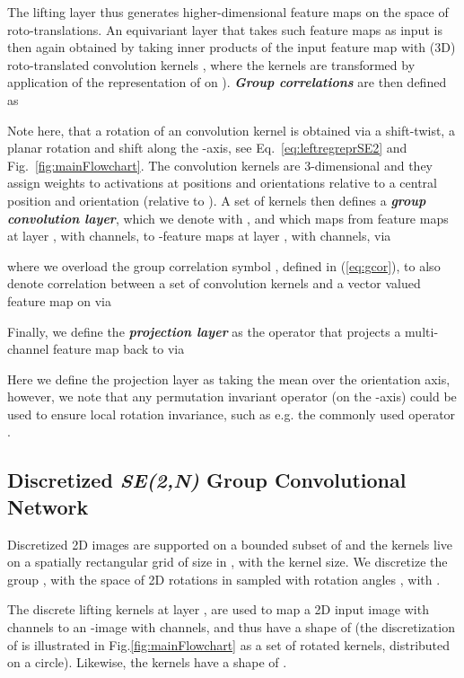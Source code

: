 \documentclass[twocolumn,final]{article}
\newcommand{\se}[1]{\textit{SE(#1)}}
\newcommand{\mset}[2]{}
\begin{document}
The lifting layer thus generates higher-dimensional feature maps on the space of roto-translations. An  equivariant layer that takes such feature maps as input is then again obtained by taking inner products of the input feature map  with (3D) roto-translated convolution kernels , where the kernels are transformed by application of the representation  of  on ).
\textbf{\emph{Group correlations}} are then defined as

Note here, that a rotation of an  convolution kernel is obtained via a shift-twist, a planar rotation and shift along the -axis, see Eq.~\eqref{eq:leftregreprSE2} and Fig.~\ref{fig:mainFlowchart}. The convolution kernels  are 3-dimensional and they assign weights to activations at positions and orientations relative to a central position and orientation (relative to ). A set of  kernels  then defines a \textbf{\emph{group convolution layer}}, which we denote with , and which maps from  feature maps  at layer , with  channels, to -feature maps  at layer , with  channels, via

where we overload the group correlation symbol , defined in (\ref{eq:gcor}), to also denote correlation between a set of convolution kernels and a vector valued feature map on  via 

Finally, we define the \textbf{\emph{projection layer}} as the operator that projects a multi-channel  feature map back to  via

Here we define the projection layer as taking the mean over the orientation axis, however, we note that any permutation invariant operator (on the -axis) could be used to ensure local rotation invariance, such as e.g. the commonly used  operator \citep{cohen2016group,bekkers2018roto}.


\subsection{Discretized \se{2,N} Group Convolutional Network}
Discretized 2D images are supported on a bounded subset of  and the kernels live on a spatially rectangular grid of size  in , with  the kernel size.
We discretize the group , with the space of 2D rotations in  sampled with  rotation angles , with . 

The discrete lifting kernels  at layer , are used to map a 2D input image with  channels to an -image with  channels, and thus have a shape of  (the discretization of  is illustrated in Fig.\ref{fig:mainFlowchart} as a set of  rotated \mset{R}{2} kernels, distributed on a circle).
Likewise, the  kernels  have a shape of .
\end{document}
